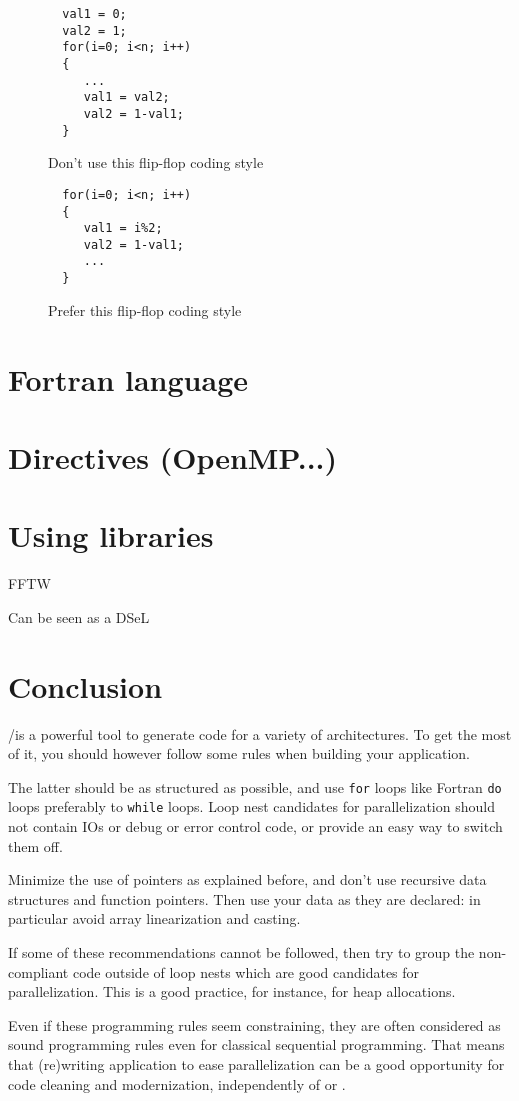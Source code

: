 \documentclass[a4paper]{article}
\begin{document}
  \begin{figure}
    \begin{lstlisting}
  val1 = 0;
  val2 = 1;
  for(i=0; i<n; i++)
  {
     ...
     val1 = val2;
     val2 = 1-val1;
  }
    \end{lstlisting}
    \caption{Don't use this flip-flop coding style}
    \label{fig:bad_flip_flop}
  \end{figure}
  \begin{figure}
    \begin{lstlisting}
  for(i=0; i<n; i++)
  {
     val1 = i%2;
     val2 = 1-val1;
     ...
  }
    \end{lstlisting}
    \caption{Prefer this flip-flop coding style}
    \label{fig:good_flip_flop}
  \end{figure}

\section{Fortran language}
\label{sec:fortran-language}


\section{Directives (OpenMP...)}
\label{sec:directives}


\section{Using libraries}
\label{sec:using-libraries}

FFTW

Can be seen as a DSeL


\section{Conclusion}
\label{sec:conclusion}

\Apips/\Apfa is a powerful tool to generate code for a variety
of architectures. To get the most of it, you should however follow
some rules when building your application.

The latter should be as structured as possible, and use
\lstinline{for} loops like Fortran \lstinline|do| loops preferably to
\lstinline{while} loops. Loop nest candidates for parallelization should
not contain IOs or debug or error control code, or provide an easy way
to switch them off.

Minimize the use of pointers as explained before, and don't use
recursive data structures and function pointers. Then use your data as they are
declared: in particular avoid array linearization and casting.

If some of these recommendations cannot be followed, then try to group
the non-compliant code outside of loop nests which are good
candidates for parallelization.  This is a good practice, for instance,
for heap allocations.

Even if these programming rules seem constraining, they are often
considered as sound programming rules even for classical sequential
programming. That means that (re)writing application to ease
parallelization can be a good opportunity for code cleaning and
modernization, independently of \Apips or \Apfa.


\end{document}
